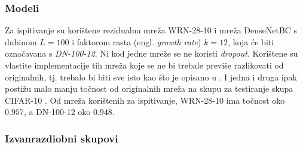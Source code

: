 \documentclass[utf8, diplomski, lmodern]{fer}
\begin{document}
\subsubsection{Modeli}

Za ispitivanje su korištene rezidualna mreža WRN-28-10 \citep{Zagoruyko:2016:WRN} i mreža DenseNetBC \citep{Huang:2016:DCCN} s dubinom $L=100$ i faktorom rasta (engl. \textit{growth rate}) $k=12$, koja će biti označavana s \textit{DN-100-12}. Ni kod jedne mreže se ne koristi \textit{dropout}. Korištene su vlastite implementacije tih mreža koje se ne bi trebale previše razlikovati od originalnih, tj. trebalo bi biti sve isto kao što je opisano u \citet{Zagoruyko:2016:WRN,Huang:2016:DCCN}. I jedna i druga ipak postižu malo manju točnost od originalnih mreža na skupu za testiranje skupa CIFAR-10 \citep{Krizhevsky:2009:LMLFTI}. Od mreža korištenih za ispitivanje, WRN-28-10 ima točnost oko $0.957$, a DN-100-12 oko $0.948$.

\subsubsection{Izvanrazdiobni skupovi}
\end{document}
